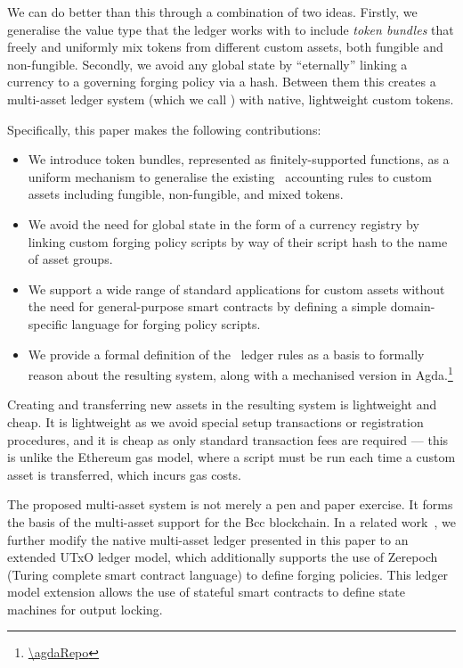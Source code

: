 We can do better than this through a combination of two ideas.
Firstly, we generalise the value type that the ledger works with to include \emph{token bundles} that freely and uniformly mix tokens from different custom assets, both fungible and non-fungible.
Secondly, we avoid any global state by ``eternally'' linking a currency to a governing forging policy via a hash.
Between them this creates a multi-asset ledger system (which we call \UTXOma) with native, lightweight custom tokens.

Specifically, this paper makes the following contributions:
%
\begin{itemize}
\item We introduce token bundles, represented as finitely-supported functions, as a uniform mechanism to generalise the existing \UTXO\ accounting rules to custom assets including fungible, non-fungible, and mixed tokens.
\item We avoid the need for global state in the form of a currency registry by linking custom forging policy scripts by way of their script hash to the name of asset groups.
\item We support a wide range of standard applications for custom assets without the need for general-purpose smart contracts by defining a simple domain-specific language for forging policy scripts.
\item We provide a formal definition of the \UTXOma\ ledger rules as a basis to formally reason about the resulting system, along with a mechanised version in Agda.\footnote{\url{\agdaRepo}}

\end{itemize}
%
Creating and transferring new assets in the resulting system is lightweight and cheap. It is lightweight as we avoid special setup transactions or registration procedures, and it is cheap as only standard transaction fees are required --- this is unlike the Ethereum gas model, where a script must
be run each time a custom asset is transferred, which incurs gas costs.

The proposed multi-asset system is not merely a pen and paper exercise. It forms the basis of the multi-asset support for the Bcc blockchain.
In a related work~\cite{eutxo-ma}, we further modify the native multi-asset ledger
presented in this paper to an extended UTxO ledger model, which additionally supports
the use of Zerepoch (Turing complete smart contract language) to define forging policies.
This ledger model extension allows the use of stateful smart contracts to define
state machines for output locking.
